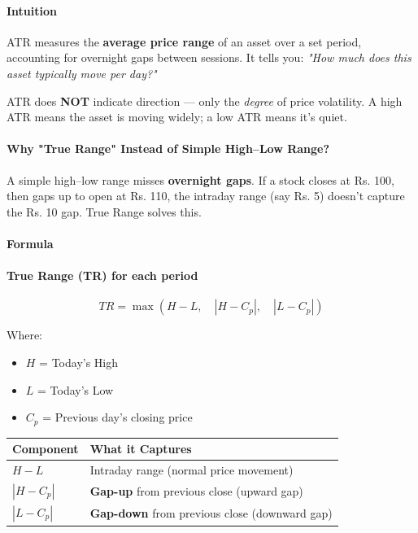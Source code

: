 \documentclass[12pt,openany]{book}
\begin{document}
\paragraph{Intuition}
ATR measures the \textbf{average price range} of an asset over a set period, accounting for overnight gaps between sessions. It tells you: \emph{"How much does this asset typically move per day?"}

ATR does \textbf{NOT} indicate direction --- only the \emph{degree} of price volatility. A high ATR means the asset is moving widely; a low ATR means it's quiet.

\paragraph{Why "True Range" Instead of Simple High--Low Range?}

A simple high--low range misses \textbf{overnight gaps}. If a stock closes at Rs. 100, then gaps up to open at Rs. 110, the intraday range (say Rs. 5) doesn't capture the Rs. 10 gap. True Range solves this.

\paragraph{Formula}

\paragraph{True Range (TR) for each period}

\[
TR = \max\left(H - L, \quad |H - C_p|, \quad |L - C_p|\right)
\]

Where:
\begin{itemize}[leftmargin=*]
    \item \(H\) = Today's High
    \item \(L\) = Today's Low
    \item \(C_p\) = Previous day's closing price
\end{itemize}

\begin{center}
\small
\renewcommand{\arraystretch}{1.2}
\begin{tabular}{|L{0.30\textwidth}|L{0.60\textwidth}|}
\hline
 \textbf{Component} & \textbf{What it Captures} \\ \hline
 \(H - L\) & Intraday range (normal price movement) \\ \hline
 \(|H - C_p|\) & \textbf{Gap-up} from previous close (upward gap) \\ \hline
 \(|L - C_p|\) & \textbf{Gap-down} from previous close (downward gap) \\ \hline
\end{tabular}
\end{center}
\end{document}
